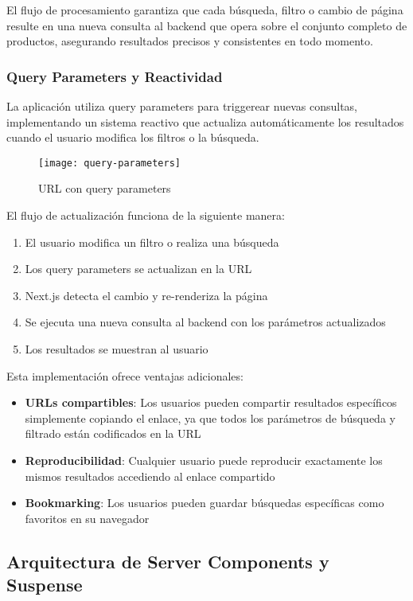 El flujo de procesamiento garantiza que cada búsqueda, filtro o cambio de página resulte en una nueva consulta al backend que opera sobre el conjunto completo de productos, asegurando resultados precisos y consistentes en todo momento.

\subsubsection{Query Parameters y Reactividad}

La aplicación utiliza query parameters para triggerear nuevas consultas, implementando un sistema reactivo que actualiza automáticamente los resultados cuando el usuario modifica los filtros o la búsqueda.

\begin{figure}[H]
    \centering
    \texttt{[image: query-parameters]}
    \caption{URL con query parameters}
\end{figure}

El flujo de actualización funciona de la siguiente manera:
\begin{enumerate}
    \item El usuario modifica un filtro o realiza una búsqueda
    \item Los query parameters se actualizan en la URL
    \item Next.js detecta el cambio y re-renderiza la página
    \item Se ejecuta una nueva consulta al backend con los parámetros actualizados
    \item Los resultados se muestran al usuario
\end{enumerate}

Esta implementación ofrece ventajas adicionales:
\begin{itemize}
    \item \textbf{URLs compartibles}: Los usuarios pueden compartir resultados específicos simplemente copiando el enlace, ya que todos los parámetros de búsqueda y filtrado están codificados en la URL
    \item \textbf{Reproducibilidad}: Cualquier usuario puede reproducir exactamente los mismos resultados accediendo al enlace compartido
    \item \textbf{Bookmarking}: Los usuarios pueden guardar búsquedas específicas como favoritos en su navegador
\end{itemize}

\subsection{Arquitectura de Server Components y Suspense}

